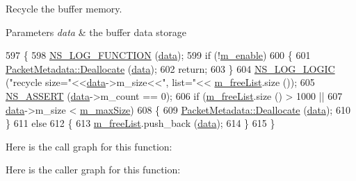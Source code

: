 Recycle the buffer memory. 


\begin{DoxyParams}{Parameters}
{\em data} & the buffer data storage \\
\hline
\end{DoxyParams}

\begin{DoxyCode}
597 \{
598   \hyperlink{log-macros-disabled_8h_a90b90d5bad1f39cb1b64923ea94c0761}{NS\_LOG\_FUNCTION} (\hyperlink{topology-example-sim_8cc_a26c65296e316af77b787dc77469bb2a4}{data});
599   \textcolor{keywordflow}{if} (!\hyperlink{classns3_1_1PacketMetadata_a666ea556ffbd8f2226195cde1abe7ae7}{m\_enable})
600     \{
601       \hyperlink{classns3_1_1PacketMetadata_a5284ea0e3b7e0e272ca521cb976431b7}{PacketMetadata::Deallocate} (\hyperlink{topology-example-sim_8cc_a26c65296e316af77b787dc77469bb2a4}{data});
602       \textcolor{keywordflow}{return};
603     \} 
604   \hyperlink{group__logging_ga88acd260151caf2db9c0fc84997f45ce}{NS\_LOG\_LOGIC} (\textcolor{stringliteral}{"recycle size="}<<\hyperlink{topology-example-sim_8cc_a26c65296e316af77b787dc77469bb2a4}{data}->m\_size<<\textcolor{stringliteral}{", list="}<<
      \hyperlink{classns3_1_1PacketMetadata_aa646ed601542eec6bb98e6219165a7c8}{m\_freeList}.size ());
605   \hyperlink{assert_8h_a6dccdb0de9b252f60088ce281c49d052}{NS\_ASSERT} (\hyperlink{topology-example-sim_8cc_a26c65296e316af77b787dc77469bb2a4}{data}->m\_count == 0);
606   \textcolor{keywordflow}{if} (\hyperlink{classns3_1_1PacketMetadata_aa646ed601542eec6bb98e6219165a7c8}{m\_freeList}.size () > 1000 ||
607       \hyperlink{topology-example-sim_8cc_a26c65296e316af77b787dc77469bb2a4}{data}->m\_size < \hyperlink{classns3_1_1PacketMetadata_a3816d0a0ab763831fd248b0b2693db1c}{m\_maxSize}) 
608     \{
609       \hyperlink{classns3_1_1PacketMetadata_a5284ea0e3b7e0e272ca521cb976431b7}{PacketMetadata::Deallocate} (\hyperlink{topology-example-sim_8cc_a26c65296e316af77b787dc77469bb2a4}{data});
610     \} 
611   \textcolor{keywordflow}{else} 
612     \{
613       \hyperlink{classns3_1_1PacketMetadata_aa646ed601542eec6bb98e6219165a7c8}{m\_freeList}.push\_back (\hyperlink{topology-example-sim_8cc_a26c65296e316af77b787dc77469bb2a4}{data});
614     \}
615 \}
\end{DoxyCode}


Here is the call graph for this function\+:




Here is the caller graph for this function\+:


